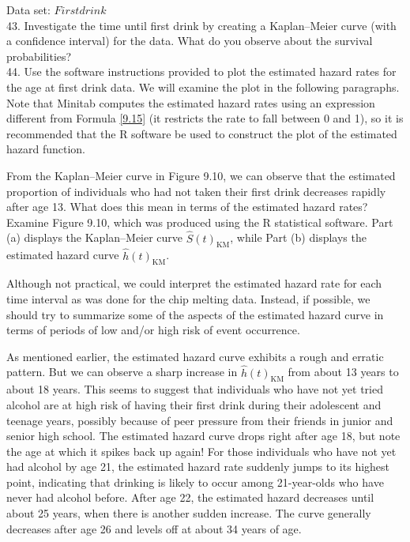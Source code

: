 \documentclass[
]{report}
\begin{document}
Data set: \(Firstdrink\)\\
43. Investigate the time until first drink by creating a Kaplan--Meier curve (with a confidence interval) for the data. What do you observe about the survival probabilities?\\
44. Use the software instructions provided to plot the estimated hazard rates for the age at first drink data. We will examine the plot in the following paragraphs. Note that Minitab computes the estimated hazard rates using an expression different from Formula \ref{9.15} (it restricts the rate to fall between 0 and 1), so it is recommended that the R software be used to construct the plot of the estimated hazard function.

From the Kaplan--Meier curve in Figure 9.10, we can observe that the estimated proportion of individuals who had not taken their first drink decreases rapidly after age 13. What does this mean in terms of the estimated hazard rates? Examine Figure 9.10, which was produced using the R statistical software. Part (a) displays the Kaplan--Meier curve \(\hat S(t)_{\mathrm{KM}}\), while Part (b) displays the estimated hazard curve \(\hat h(t)_{\mathrm{KM}}\).

Although not practical, we could interpret the estimated hazard rate for each time interval as was done for
the chip melting data. Instead, if possible, we should try to summarize some of the aspects of the estimated
hazard curve in terms of periods of low and/or high risk of event occurrence.

As mentioned earlier, the estimated hazard curve exhibits a rough and erratic pattern. But we can observe
a sharp increase in \(\hat h(t)_{\mathrm{KM}}\) from about 13 years to about 18 years. This seems to suggest that individuals who have not yet tried alcohol are at high risk of having their first drink during their adolescent and teenage years,
possibly because of peer pressure from their friends in junior and senior high school. The estimated hazard
curve drops right after age 18, but note the age at which it spikes back up again! For those individuals who
have not yet had alcohol by age 21, the estimated hazard rate suddenly jumps to its highest point, indicating
that drinking is likely to occur among 21-year-olds who have never had alcohol before. After age 22, the
estimated hazard decreases until about 25 years, when there is another sudden increase. The curve generally
decreases after age 26 and levels off at about 34 years of age.
\end{document}
